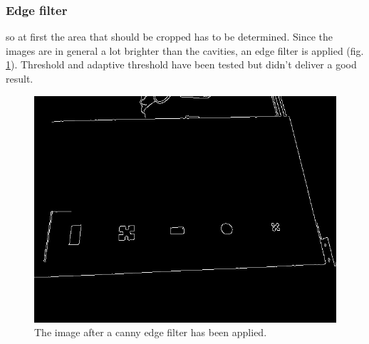 \documentclass{article}
\begin{document}
\subsubsection*{Edge filter}
so at first the area that should be cropped has to be determined. Since the images are in general a lot brighter than the cavities, an edge filter is applied (fig. \ref{fig:edges}). Threshold and adaptive threshold have been tested but didn't deliver a good result.\\
\begin{figure}[h!]
\centering
\includegraphics[scale=0.3]{images/edges.jpg}
\caption{The image after a canny edge filter has been applied.}
\label{fig:edges}
\end{figure}
\end{document}
